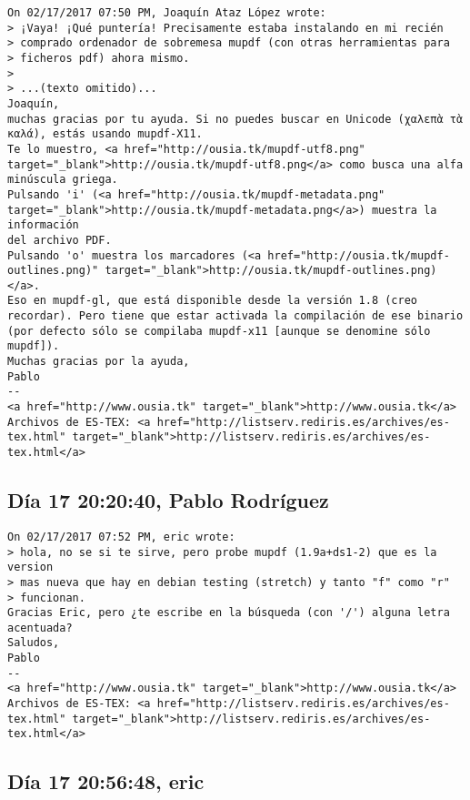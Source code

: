 \documentclass[a4paper,10pt]{article}
\begin{document}
\begin{lstlisting}
On 02/17/2017 07:50 PM, Joaquín Ataz López wrote:
> ¡Vaya! ¡Qué puntería! Precisamente estaba instalando en mi recién 
> comprado ordenador de sobremesa mupdf (con otras herramientas para 
> ficheros pdf) ahora mismo.
> 
> ...(texto omitido)...
Joaquín,
muchas gracias por tu ayuda. Si no puedes buscar en Unicode (χαλεπὰ τὰ
καλά), estás usando mupdf-X11.
Te lo muestro, <a href="http://ousia.tk/mupdf-utf8.png" target="_blank">http://ousia.tk/mupdf-utf8.png</a> como busca una alfa
minúscula griega.
Pulsando 'i' (<a href="http://ousia.tk/mupdf-metadata.png" target="_blank">http://ousia.tk/mupdf-metadata.png</a>) muestra la información
del archivo PDF.
Pulsando 'o' muestra los marcadores (<a href="http://ousia.tk/mupdf-outlines.png)" target="_blank">http://ousia.tk/mupdf-outlines.png)</a>.
Eso en mupdf-gl, que está disponible desde la versión 1.8 (creo
recordar). Pero tiene que estar activada la compilación de ese binario
(por defecto sólo se compilaba mupdf-x11 [aunque se denomine sólo mupdf]).
Muchas gracias por la ayuda,
Pablo
-- 
<a href="http://www.ousia.tk" target="_blank">http://www.ousia.tk</a>
Archivos de ES-TEX: <a href="http://listserv.rediris.es/archives/es-tex.html" target="_blank">http://listserv.rediris.es/archives/es-tex.html</a>

\end{lstlisting}

\subsection{Día 17 20:20:40, Pablo Rodríguez}

\begin{lstlisting}
On 02/17/2017 07:52 PM, eric wrote:
> hola, no se si te sirve, pero probe mupdf (1.9a+ds1-2) que es la version 
> mas nueva que hay en debian testing (stretch) y tanto "f" como "r" 
> funcionan.
Gracias Eric, pero ¿te escribe en la búsqueda (con '/') alguna letra
acentuada?
Saludos,
Pablo
-- 
<a href="http://www.ousia.tk" target="_blank">http://www.ousia.tk</a>
Archivos de ES-TEX: <a href="http://listserv.rediris.es/archives/es-tex.html" target="_blank">http://listserv.rediris.es/archives/es-tex.html</a>

\end{lstlisting}

\subsection{Día 17 20:56:48, eric}
\end{document}
